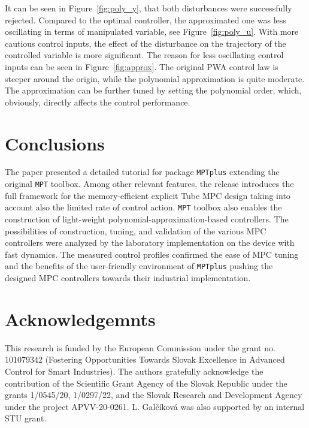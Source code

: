 \documentclass[letterpaper, 10 pt, conference]{ieeeconf}
\begin{document}
	It can be seen in Figure~\ref{fig:poly_y}, that both disturbances were successfully rejected. Compared to the optimal controller, the approximated one was less oscillating in terms of manipulated variable, see Figure~\ref{fig:poly_u}. With more cautious control inputs, the effect of the disturbance on the trajectory of the controlled variable is more significant. The reason for less oscillating control inputs can be seen in Figure~\ref{fig:approx}. The original PWA control law is steeper around the origin, while the polynomial approximation is quite moderate. The approximation can be further tuned by setting the polynomial order, which, obviously, directly affects the control performance.
	
	
	\section{Conclusions}
	\label{sec:conclusions}
	
	The paper presented a detailed tutorial for package \texttt{MPTplus} extending the original \texttt{MPT} toolbox. Among other relevant features, the release introduces the full framework for the memory-efficient explicit Tube MPC design taking into account also the limited rate of control action. \texttt{MPT} toolbox also enables the construction of light-weight polynomial-approximation-based controllers. The possibilities of construction, tuning, and validation of the various MPC controllers were analyzed by the laboratory implementation on the device with fast dynamics. The measured control profiles confirmed the ease of MPC tuning and the benefits of the user-friendly environment of \texttt{MPTplus} pushing the designed MPC controllers towards their industrial implementation.
	
	\addtolength{\textheight}{-12cm}
	
	\section*{Acknowledgemnts}
	
	\small{
		This research is funded by the European Commission under the grant no. 101079342 (Fostering Opportunities Towards Slovak Excellence in Advanced Control for Smart Industries). The authors gratefully acknowledge the contribution of the Scientific Grant Agency of the Slovak Republic under the grants 1/0545/20, 1/0297/22, and the Slovak Research and Development Agency under the project APVV-20-0261. L. Galčíková was also supported by an internal STU grant. 
	}
	
	
	
	
	
\end{document}
